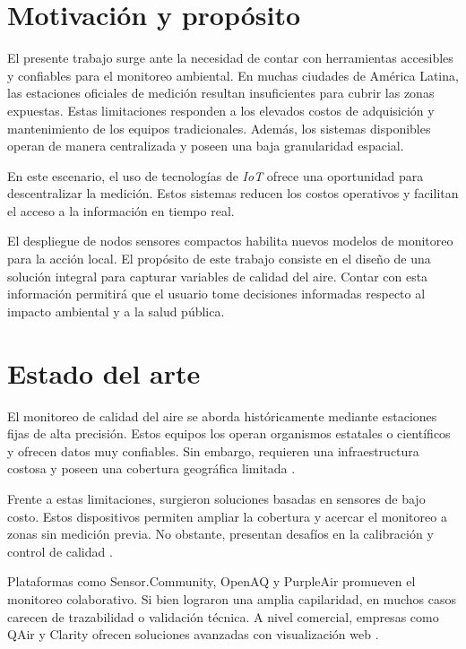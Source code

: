 \section{Motivación y propósito}

El presente trabajo surge ante la necesidad de contar con herramientas accesibles y confiables para el monitoreo ambiental. En muchas ciudades de América Latina, las estaciones oficiales de medición resultan insuficientes para cubrir las zonas expuestas. Estas limitaciones responden a los elevados costos de adquisición y mantenimiento de los equipos tradicionales. Además, los sistemas disponibles operan de manera centralizada y poseen una baja granularidad espacial.

En este escenario, el uso de tecnologías de \textit{IoT} ofrece una oportunidad para descentralizar la medición. Estos sistemas reducen los costos operativos y facilitan el acceso a la información en tiempo real.

El despliegue de nodos sensores compactos habilita nuevos modelos de monitoreo para la acción local. El propósito de este trabajo consiste en el diseño de una solución integral para capturar variables de calidad del aire. Contar con esta información permitirá que el usuario tome decisiones informadas respecto al impacto ambiental y a la salud pública.


\section{Estado del arte}

El monitoreo de calidad del aire se aborda históricamente mediante estaciones fijas de alta precisión. Estos equipos los operan organismos estatales o científicos y ofrecen datos muy confiables. Sin embargo, requieren una infraestructura costosa y poseen una cobertura geográfica limitada \cite{EPA:2025}.

Frente a estas limitaciones, surgieron soluciones basadas en sensores de bajo costo. Estos dispositivos permiten ampliar la cobertura y acercar el monitoreo a zonas sin medición previa. No obstante, presentan desafíos en la calibración y control de calidad \cite{Morawska:2018, Castell:2017}.

Plataformas como Sensor.Community, OpenAQ y PurpleAir promueven el monitoreo colaborativo. Si bien lograron una amplia capilaridad, en muchos casos carecen de trazabilidad o validación técnica. A nivel comercial, empresas como QAir y Clarity ofrecen soluciones avanzadas con visualización web \cite{SensorCommunity:2025, OpenAQ:2020, PurpleAir:2021}.

